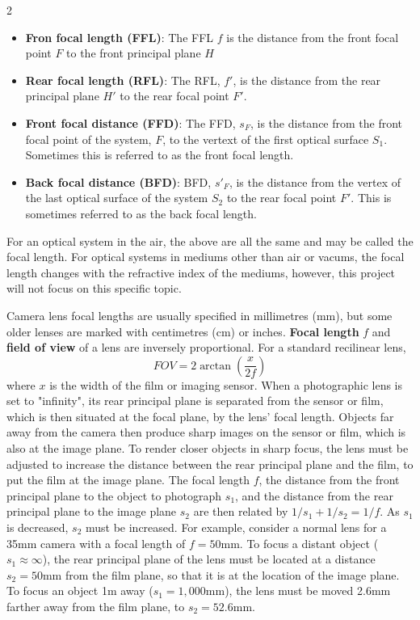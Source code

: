 \documentclass[10pt]{article}
\begin{document}
\begin{multicols}{2}
\begin{itemize}
    \item \textbf{Fron focal length (FFL)}: The FFL $f$ is the distance from the front focal point $F$ to the front principal plane $H$
    \item \textbf{Rear focal length (RFL)}: The RFL, $f'$, is the distance from the rear principal plane $H'$ to the rear focal point $F'$.
    \item \textbf{Front focal distance (FFD)}: The FFD, $s_F$, is the distance from the front focal point of the system, $F$, to the vertext of the first optical surface $S_1$. Sometimes this is referred to as the front focal length.
    \item \textbf{Back focal distance (BFD)}: BFD, $s'_F$, is the distance from the vertex of the last optical surface of the system $S_2$ to the rear focal point $F'$. This is sometimes referred to as the back focal length.
\end{itemize}
For an optical system in the air, the above are all the same and may be called the focal length.
\newline \newline
For optical systems in mediums other than air or vacums, the focal length changes with the refractive index of the mediums, however, this project will not focus on this specific topic.

Camera lens focal lengths are usually specified in millimetres (mm), but some older lenses are marked with centimetres (cm) or inches.
\textbf{Focal length} $f$ and \textbf{field of view} of a lens are inversely proportional. For a standard recilinear lens,
\begin{equation}
    FOV = 2\arctan(\frac{x}{2f})
    \label{eq:fov}
\end{equation}
where $x$ is the width of the film or imaging sensor. When a photographic lens is set to "infinity", its rear principal plane is separated from the sensor or film, which is then situated at the focal plane, by the lens' focal length. Objects far away from the camera then produce sharp images on the sensor or film, which is also at the image plane.
\newline \newline
To render closer objects in sharp focus, the lens must be adjusted to increase the distance between the rear principal plane and the film, to put the film at the image plane. The focal length $f$, the distance from the front principal plane to the object to photograph $s_1$, and the distance from the rear principal plane to the image plane $s_2$ are then related by \(1/s_1 + 1/s_2 = 1/f\).
As $s_1$ is decreased, $s_2$ must be increased. For example, consider a normal lens for a 35mm camera with a focal length of $f=50$mm. To focus a distant object ($s_1 \approx \infty$), the rear principal plane of the lens must be located at a distance $s_2=50$mm from the film plane, so that it is at the location of the image plane. To focus an object 1m away ($s_1 = 1,000$mm), the lens must be moved 2.6mm farther away from the film plane, to $s_2=52.6$mm.


\end{multicols}
\end{document}
